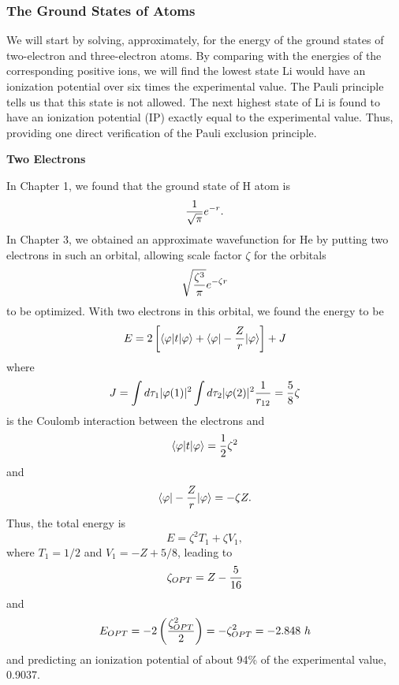 {\subsubsection{The Ground States of Atoms}

We will start by solving, approximately, for the energy of the ground 
states of two-electron and three-electron atoms.  By comparing with the 
energies of the corresponding positive ions, we will find the lowest state 
Li would have an ionization potential over six times the experimental 
value.  The Pauli principle tells us that this
state is not allowed. The next highest state of Li is found to have an 
ionization potential (IP) exactly equal to the experimental value.  Thus, 
providing one direct verification of the Pauli exclusion principle.

{\bf Two Electrons}

In Chapter 1, we found that the ground state of H atom is
\begin{equation}
{1 \over \sqrt{\pi}} e^{-r} .
\end{equation}
In Chapter 3, we obtained an approximate wavefunction for He by putting
two electrons in such an orbital, allowing scale factor $\zeta$ for the 
orbitals
\begin{equation}
\sqrt{{\zeta^3 \over \pi}} e^{- \zeta r}
\label{chap4app-eqno1}
\end{equation}
to be optimized.  With two electrons in this orbital, we found the energy 
to be
\begin{equation}
E = 2 \left[ \langle \varphi | t | \varphi \rangle + \langle \varphi | - {Z 
\over r} | \varphi \rangle \right] + J
\end{equation}
where
\begin{equation}
J = \int d \tau_1 | \varphi (1) |^2 \int d \tau_2 | \varphi (2) |^2 {1 \over 
r_{12}} = {5 \over 8} \zeta
\end{equation}
is the Coulomb interaction between the electrons and
\begin{equation}
\langle \varphi | t | \varphi \rangle = {1 \over 2} \zeta^2
\end{equation}
and
\begin{equation}
\langle \varphi | - {Z \over r} | \varphi \rangle = - \zeta Z .
\end{equation}
Thus, the total energy is
\begin{equation}
E = \zeta^2 T_1 + \zeta V_1 ,
\label{chap4app-eqno2}
\end{equation}
where $T_1 = 1/2$ and $V_1 = -Z + 5/8$, leading to
\begin{equation}
\zeta_{OPT} = Z - {5 \over 16}
\end{equation}
and
\begin{equation}
E_{OPT} = - 2 \left( {\zeta^2_{OPT} \over 2} \right) = - \zeta^2_{OPT} = - 
2.848\ h
\label{chap4app-eqno3}
\end{equation}
and predicting an ionization potential of about 94\% of the 
experimental value, 0.9037.

}
